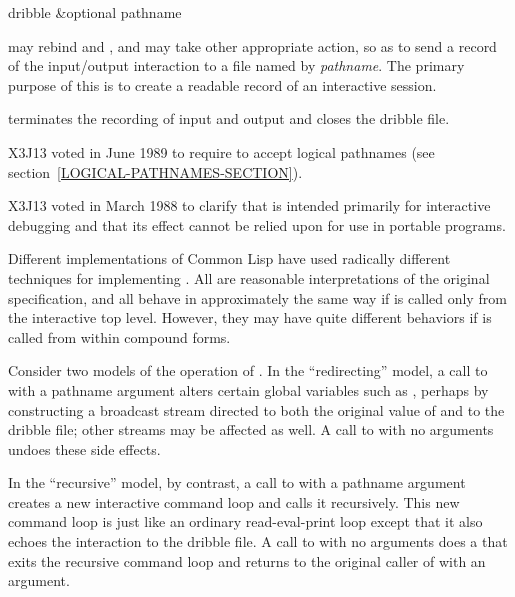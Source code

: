 \begin{defun}[Function]
dribble &optional pathname

 may rebind 
and , and may take other appropriate
action, so as to send a record of the
input/output interaction to a file named by {\it pathname}.
The primary purpose of this is to create a readable record of an interactive
session.

 terminates the recording of input and output and
closes the dribble file.

\begin{newer}
X3J13 voted in June 1989  to require 
to accept logical pathnames (see section~\ref{LOGICAL-PATHNAMES-SECTION}).
\end{newer}

\begin{new}
X3J13 voted in March 1988
to clarify that  is intended primarily
for interactive debugging and that its effect cannot be
relied upon for use in portable
programs.

Different implementations of Common Lisp have used radically different
techniques for implementing .  All are reasonable interpretations
of the original specification, and all behave in approximately the same
way if  is called only from the interactive top level.
However, they may have quite different behaviors if  is
called from within compound forms.

Consider two models of the operation of .  In the ``redirecting''
model, a call to  with a pathname argument
alters certain global variables such as ,
perhaps by constructing a broadcast stream directed to both the original
value of  and to the dribble file; other streams
may be affected as well.  A call to  with no arguments
undoes these side effects.

In the ``recursive'' model, by contrast, a call to  with a
pathname argument creates a new interactive command loop and calls it
recursively.  This new command loop is just like an ordinary
read-eval-print loop except that it also echoes the interaction to
the dribble file.  A call to  with no arguments
does a  that exits the recursive command loop and returns
to the original caller of  with an argument.


\end{new}
\end{defun}
